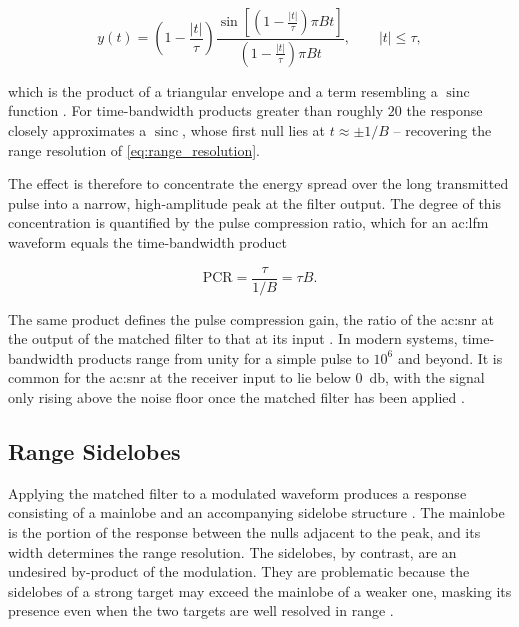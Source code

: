 \begin{equation}
  y(t) = \left(1 - \frac{|t|}{\tau}\right)
         \frac{\sin\left[\left(1 - \frac{|t|}{\tau}\right)\pi B t\right]}
              {\left(1 - \frac{|t|}{\tau}\right)\pi B t},
  \qquad |t| \leq \tau ,
  \label{eq:lfm_compressed}
\end{equation}

which is the product of a triangular envelope and a term resembling a $\operatorname{sinc}$ function \cite{pomr}. For time-bandwidth products greater than roughly $20$ the response closely approximates a $\operatorname{sinc}$, whose first null lies at $t \approx \pm 1/B$ -- recovering the range resolution of \eqref{eq:range_resolution}.

The effect is therefore to concentrate the energy spread over the long transmitted pulse into a narrow, high-amplitude peak at the filter output. The degree of this concentration is quantified by the pulse compression ratio, which for an \gls{ac:lfm} waveform equals the time-bandwidth product

\begin{equation}
  \text{PCR} = \frac{\tau}{1/B} = \tau B .
  \label{eq:pulse_compression_ratio}
\end{equation}

The same product defines the pulse compression gain, the ratio of the \gls{ac:snr} at the output of the matched filter to that at its input \cite{pomr}. In modern systems, time-bandwidth products range from unity for a simple pulse to $10^6$ and beyond. It is common for the \gls{ac:snr} at the receiver input to lie below \qty{0}{\decibel}, with the signal only rising above the noise floor once the matched filter has been applied \cite{pomr}.

\subsection{Range Sidelobes}\label{sec:range_sidelobes}

Applying the matched filter to a modulated waveform produces a response consisting of a mainlobe and an accompanying sidelobe structure \cite{pomr}. The mainlobe is the portion of the response between the nulls adjacent to the peak, and its width determines the range resolution. The sidelobes, by contrast, are an undesired by-product of the modulation. They are problematic because the sidelobes of a strong target may exceed the mainlobe of a weaker one, masking its presence even when the two targets are well resolved in range \cite{pomr}.

